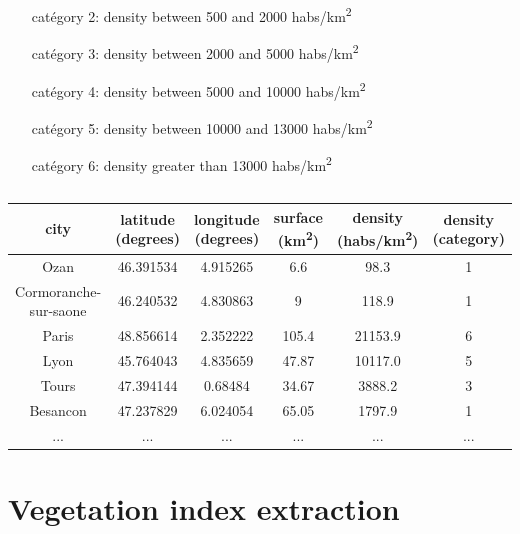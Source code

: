 \documentclass[c]{beamer}
\begin{document}
\begin{frame}
\begin{columns}
\begin{column}{0.50\textwidth}
\begin{overlayarea}{\linewidth}{3cm}
{\begin{itemize}
    \item[catégory 2:] density between 500 and 2000 habs/km\textsuperscript{2}
    \item[catégory 3:] density between 2000 and 5000 habs/km\textsuperscript{2}
    \item[catégory 4:] density between 5000 and 10000 habs/km\textsuperscript{2}
    \item[catégory 5:] density between 10000 and 13000 habs/km\textsuperscript{2}
    \item[catégory 6:] density greater than 13000 habs/km\textsuperscript{2}
    \end{itemize}
  }
  \end{overlayarea}
 \end{column}
\end{columns}

\begin{table}
\begin{center}
\begin{adjustbox}{max width=\textwidth}
{\tiny
\begin{tabular}{|c|c|c|c|c|c|}
\hline 
city & latitude (degrees) & longitude (degrees) & surface (km\textsuperscript{2}) & density (habs/km\textsuperscript{2}) & density (category)\\
\hline
Ozan & 46.391534 & 4.915265 & 6.6 & 98.3 & 1\\
\hline 
Cormoranche-sur-saone & 46.240532 & 4.830863 & 9 & 118.9 & 1\\
\hline 
Paris & 48.856614 & 2.352222 & 105.4 & 21153.9 & 6\\
\hline
Lyon & 45.764043 & 4.835659 & 47.87 & 10117.0 & 5\\
\hline
Tours & 47.394144 & 0.68484 & 34.67 & 3888.2 & 3\\
\hline
Besancon & 47.237829 & 6.024054 & 65.05 & 1797.9 & 1\\
\hline 
... & ... & ... & ... & ... & ...\\
\hline
\end{tabular}
}
\end{adjustbox}
\end{center}
\end{table}

\end{frame}

\section{Vegetation index extraction}
\begin{frame}
\tableofcontents[currentsection]
\end{frame}
\end{document}
